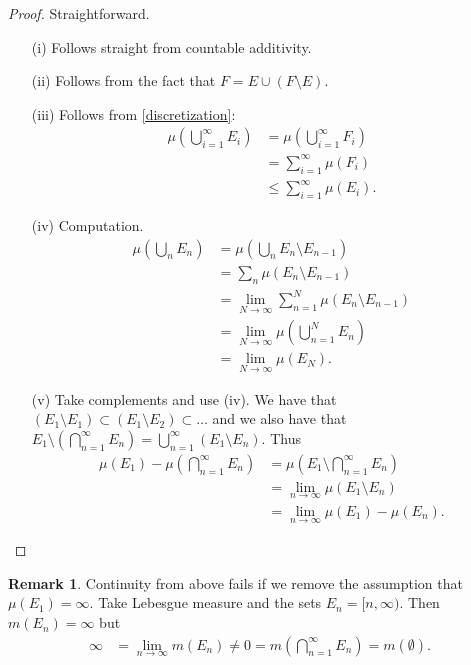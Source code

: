 \documentclass[11pt]{amsart}
\theoremstyle{definition}
\newtheorem{remark}[theorem]{Remark}
\numberwithin{equation}{section}
\begin{document}
\begin{proof}
    Straightforward.
    \begin{enumerate}
        \item [(i)] Follows straight from countable additivity.
        \item [(ii)] Follows from the fact that $F=E\cup(F\setminus E)$.
        \item [(iii)] Follows from \ref{discretization}:
        \begin{align*}
            \mu(\bigcup_{i=1}^\infty E_i)&=\mu(\bigcup_{i=1}^\infty F_i)\\
            &=\sum_{i=1}^\infty\mu(F_i)\\
            &\le \sum_{i=1}^\infty\mu(E_i).
        \end{align*}
        \item [(iv)] Computation.
        \begin{align*}
            \mu(\bigcup_n E_n)&=\mu(\bigcup_n E_n\setminus E_{n-1})\\
            &=\sum_n\mu(E_n\setminus E_{n-1})\\
            &=\lim_{N\to\infty}\sum_{n=1}^N\mu(E_n\setminus E_{n-1})\\
            &=\lim_{N\to\infty}\mu(\bigcup_{n=1}^N E_n)\\
            &=\lim_{N\to\infty}\mu(E_N).
        \end{align*}
        \item [(v)] Take complements and use (iv). We have that $(E_1\setminus E_1)\subset (E_1\setminus E_2)\subset\ldots$ and we also have that $E_1\setminus(\bigcap_{n=1}^\infty E_n)=\bigcup_{n=1}^\infty (E_1\setminus E_n)$. Thus
        \begin{align*}
            \mu(E_1)-\mu(\bigcap_{n=1}^\infty E_n)&=\mu(E_1\setminus\bigcap_{n=1}^\infty E_n)\\
            &=\lim_{n\to\infty} \mu(E_1\setminus E_n)\\
            &=\lim_{n\to\infty} \mu(E_1)-\mu(E_n).
        \end{align*}
    \end{enumerate}
\end{proof}
\begin{remark}
    Continuity from above fails if we remove the assumption that $\mu(E_1)=\infty$. Take Lebesgue measure and the sets $E_n=[n,\infty)$. Then $m(E_n)=\infty$ but
    \begin{align*}
        \infty&=\lim_{n\to\infty} m(E_n)\ne0=m(\bigcap_{n=1}^\infty E_n)=m(\emptyset).
    \end{align*}
\end{remark}
\end{document}
